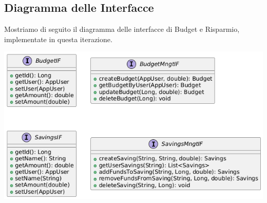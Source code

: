 \subsection{Diagramma delle Interfacce}
Mostriamo di seguito il diagramma delle interfacce di Budget e Risparmio, implementate in questa iterazione.

\hspace{5pt}
\begin{center}
    \includegraphics[scale=0.6]{images/InterfaceUML-iterazione3.png}
\end{center}
